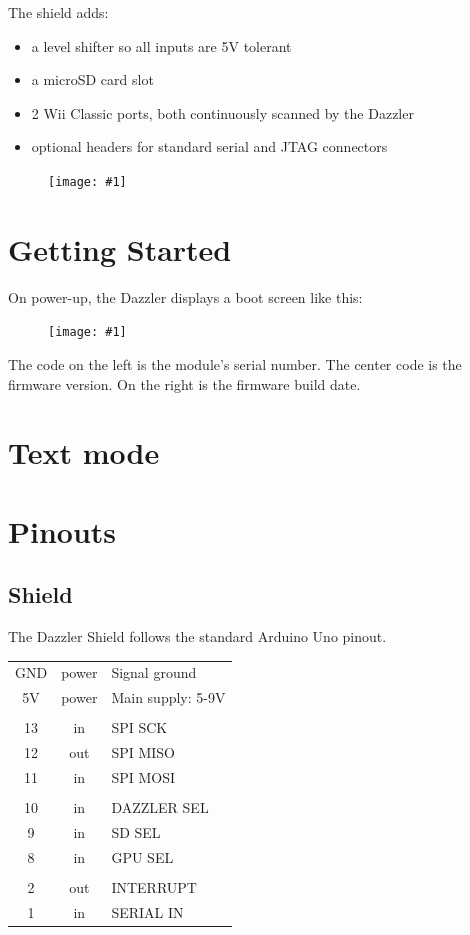 \documentclass{article}
\newcommand{\dev}{Dazzler}
\newcommand{\png}[1]{
\begin{figure}[H]
\begin{center}
\texttt{[image: \#1]}
\end{center}
\end{figure}
}
\newcommand{\pngw}[2]{
\begin{figure}[H]
\begin{center}
\texttt{[image: \#1]}
\end{center}
\end{figure}
}
\newcommand{\gap}{\vspace{10pt}}
\begin{document}
\noindent
The shield adds:
\begin{itemize}
\item a level shifter so all inputs are 5V tolerant
\item a microSD card slot
\item 2 Wii Classic ports, both continuously scanned by the Dazzler
\item optional headers for standard serial and JTAG connectors
\end{itemize}

\png{img/gameduino-3x-dazzler/rot-0182}

\newpage
\section{Getting Started}

On power-up, the \dev{} displays a boot screen like this:

\pngw{img/gameduino-3x-dazzler/boot}{1.0}

The code on the left is the module's serial number. 
The center code is the firmware version. 
On the right is the firmware build date.

\newpage
\section{Text mode}

\newpage
\section{Pinouts}

\subsection{Shield}
The Dazzler Shield follows the standard Arduino Uno pinout.

\gap
\begin{center}
\begin{tabular}{ccl}
\hline
GND	& power & Signal ground \\
5V	& power	& Main supply: 5-9V \\
\\
13	& in	& SPI SCK \\
12	& out	& SPI MISO \\
11	& in	& SPI MOSI \\
\\
10	& in	& DAZZLER SEL \\
9	& in	& SD SEL \\
8	& in	& GPU SEL \\
\\
2	& out	& INTERRUPT \\
1	& in 	& SERIAL IN \\
\hline
\end{tabular}
\end{center}
\gap
\end{document}
